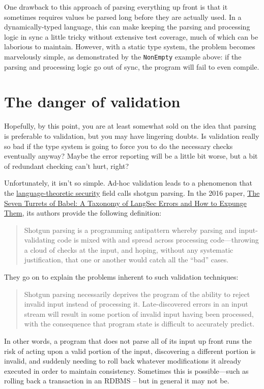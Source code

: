 One drawback to this approach of parsing everything up front is that it sometimes requires values be parsed long before they are actually used. In a dynamically-typed language, this can make keeping the parsing and processing logic in sync a little tricky without extensive test coverage, much of which can be laborious to maintain. However, with a static type system, the problem becomes marvelously simple, as demonstrated by the \texttt{NonEmpty} example above: if the parsing and processing logic go out of sync, the program will fail to even compile.


\section{The danger of validation}


Hopefully, by this point, you are at least somewhat sold on the idea that parsing is preferable to validation, but you may have lingering doubts. Is validation really so bad if the type system is going to force you to do the necessary checks eventually anyway? Maybe the error reporting will be a little bit worse, but a bit of redundant checking can't hurt, right?

Unfortunately, it isn't so simple. Ad-hoc validation leads to a phenomenon that the \href{http://langsec.org/}{language-theoretic security} field calls shotgun parsing. In the 2016 paper, \href{http://langsec.org/papers/langsec-cwes-secdev2016.pdf}{The Seven Turrets of Babel: A Taxonomy of LangSec Errors and How to Expunge Them}, its authors provide the following definition:
\begin{quotation}
\noindent Shotgun parsing is a programming antipattern whereby parsing and input-validating code is mixed with and spread across processing code—throwing a cloud of checks at the input, and hoping, without any systematic justification, that one or another would catch all the ``bad'' cases.
\end{quotation} 
They go on to explain the problems inherent to such validation techniques:
\begin{quotation}
\noindent Shotgun parsing necessarily deprives the program of the ability to reject invalid input instead of processing it. Late-discovered errors in an input stream will result in some portion of invalid input having been processed, with the consequence that program state is difficult to accurately predict.
\end{quotation} 
In other words, a program that does not parse all of its input up front runs the risk of acting upon a valid portion of the input, discovering a different portion is invalid, and suddenly needing to roll back whatever modifications it already executed in order to maintain consistency. Sometimes this is possible—such as rolling back a transaction in an RDBMS -- but in general it may not be.

